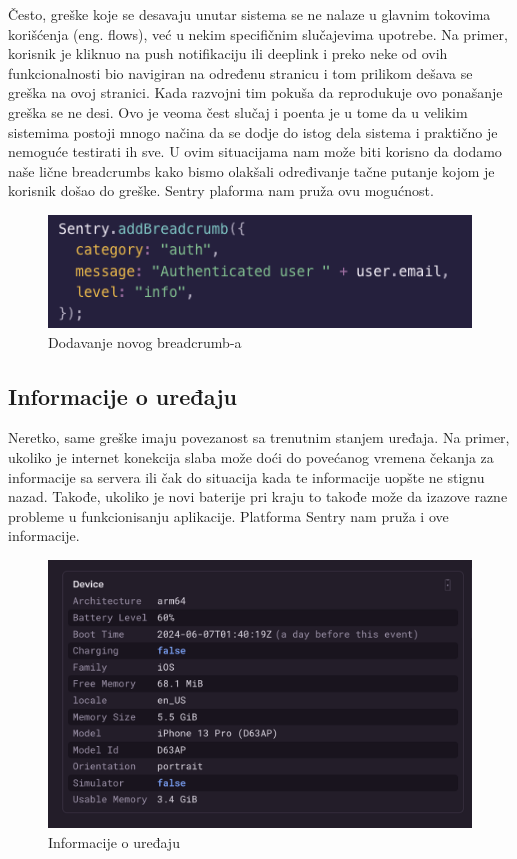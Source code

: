 \documentclass[12pt,oneside]{memoir}
\begin{document}
Često, greške koje se desavaju unutar sistema se ne nalaze u glavnim tokovima korišćenja (eng. flows), već u nekim specifičnim slučajevima upotrebe. Na primer, korisnik je kliknuo na push notifikaciju ili deeplink i preko neke od ovih funkcionalnosti bio navigiran na određenu stranicu i tom prilikom dešava se greška na ovoj stranici. Kada razvojni tim pokuša da reprodukuje ovo ponašanje greška se ne desi. Ovo je veoma čest slučaj i poenta je u tome da u velikim sistemima postoji mnogo načina da se dodje do istog dela sistema i praktično je nemoguće testirati ih sve. U ovim situacijama nam može biti korisno da dodamo naše lične breadcrumbs kako bismo olakšali određivanje tačne putanje kojom je korisnik došao do greške. Sentry plaforma nam pruža ovu mogućnost.

\begin{figure}[h!]
\centering
\includegraphics[scale=0.8]{docs/images/chapterSeven/addBreadcrumb.png}
\caption{Dodavanje novog breadcrumb-a}
\label{fig:addBreadcrumb}
\end{figure}

\subsection{Informacije o uređaju}

Neretko, same greške imaju povezanost sa trenutnim stanjem uređaja. Na primer, ukoliko je internet konekcija slaba može doći do povećanog vremena čekanja za informacije sa servera ili čak do situacija kada te informacije uopšte ne stignu nazad. Takođe, ukoliko je novi baterije pri kraju to takođe može da izazove razne probleme u funkcionisanju aplikacije. Platforma Sentry nam pruža i ove informacije.

\begin{figure}[h!]
\centering
\includegraphics[scale=0.8]{docs/images/chapterSeven/deviceInfo.png}
\caption{Informacije o uređaju}
\label{fig:deviceInfo}
\end{figure}
\end{document}
